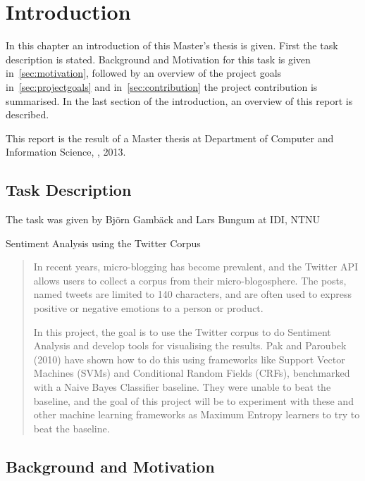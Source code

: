 \chapter{Introduction}

In this chapter an introduction of this Master's thesis is given. First the task description is stated. Background and Motivation for this task is given in~\autoref{sec:motivation}, followed by an overview of the project goals in~\autoref{sec:projectgoals} and in~\autoref{sec:contribution} the project contribution is summarised. In the last section of the introduction, an overview of this report is described. 

This report is the result of a Master thesis at Department of Computer and Information Science, , 2013. 

\section{Task Description}
\label{sec:task}

The task was given by Bj\"{o}rn Gamb\"{a}ck and Lars Bungum at IDI, NTNU

\begin{center} \Large Sentiment Analysis using the Twitter Corpus \end{center}
\begin{quotation}
In recent years, micro-blogging has become prevalent, and the Twitter API allows users to collect a corpus from their micro-blogosphere. The posts, named tweets are limited to 140 characters, and are often used to express positive or negative emotions to a person or product.

In this project, the goal is to use the Twitter corpus to do Sentiment Analysis and develop tools for visualising the results. Pak and Paroubek (2010) have shown how to do this using frameworks like Support Vector Machines (SVMs) and Conditional Random Fields (CRFs), benchmarked with a Naive Bayes Classifier baseline. They were unable to beat the baseline, and the goal of this project will be to experiment with these and other machine learning frameworks as Maximum Entropy learners to try to beat the baseline.
\end{quotation}


\section{Background and Motivation}
\label{sec:motivation}

